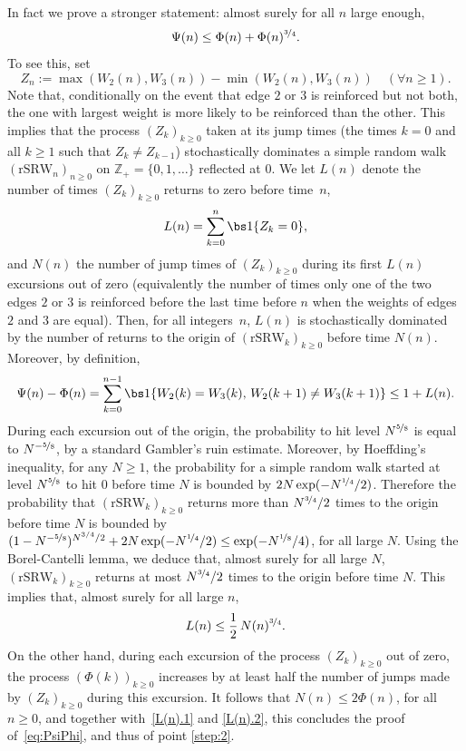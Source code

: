 In fact we prove a stronger statement: almost surely for all $n$ large enough,
\begin{equation}\label{eq:PsiPhi}
\Psi(n) \le \Phi(n) + \Phi(n)^{\nicefrac34}.
\end{equation}
To see this, set
\[
Z_n := \max(W_2(n) , W_3(n)) - \min(W_2(n),W_3(n))\quad (\forall n\geq 1).
\]
Note that, conditionally on the event that edge $2$ or $3$ is reinforced but not both,
the one with largest weight is more likely to be reinforced than the other.
This implies that the process $(Z_k)_{k\ge 0}$ taken at its jump times (\ie the times $k=0$ and all $k\geq 1$ such that $Z_k\neq Z_{k-1}$)
stochastically dominates a simple random walk $(\mathrm{rSRW}_n)_{n\geq 0}$
on $\mathbb Z_+=\{0,1,\dots\}$ reflected at $0$.
We let $L(n)$ denote the number of times $(Z_k)_{k\ge 0}$ returns to zero before time~$n$, \ie
\[
L(n) = \sum_{k=0}^n \bs 1\{Z_k = 0\},
\]
and $N(n)$ the number of jump times of $(Z_k)_{k\ge 0}$ during its first $L(n)$ excursions out of zero
(equivalently the number of times only one of the two edges $2$ or $3$ is reinforced before the last time before $n$ when the weights of edges $2$ and $3$ are equal).
Then, for all integers~$n$, $L(n)$ is stochastically dominated by the number of returns to the origin of $(\mathrm{rSRW}_k)_{k\geq 0}$ before time $N(n)$.
Moreover, by definition,
\begin{equation}\label{L(n).1}
\Psi(n) - \Phi(n) = \sum_{k=0}^{n-1} \bs 1\{W_2(k) = W_3(k), \, W_2(k+1)\neq W_3(k+1)\} \le 1+ L(n).
\end{equation}
During each excursion out of the origin,
the probability to hit level $N^{\nicefrac58}$ is equal to $N^{-\nicefrac58}$, by a standard Gambler's ruin estimate. Moreover, by Hoeffding's inequality, for any $N\ge 1$,
the probability for a simple random walk started at level $N^{\nicefrac58}$ to hit $0$ before time $N$ is bounded by $2N\exp(-N^{\nicefrac14}/2)$.
Therefore the probability that
$(\mathrm{rSRW}_k)_{k\geq 0}$ returns more than $N^{\nicefrac34}/2$ times to the origin before time $N$ is bounded by $(1-N^{-\nicefrac58})^{N^{3/4}/2}+2N\exp(-N^{\nicefrac14}/2) \le \exp(-N^{\nicefrac18}/4)$, for all large $N$.
Using {the} Borel-Cantelli lemma, we deduce that, almost surely for all large $N$, $(\mathrm{rSRW}_k)_{k\geq 0}$ returns at most $N^{\nicefrac34}/2$ times to the origin before time $N$.
This implies that,
almost surely for all large $n$,
\begin{equation}\label{L(n).2}
L(n) \le \frac12\, N(n)^{\nicefrac 34}.
\end{equation}
On the other hand, during each excursion of the process $(Z_k)_{k\ge 0}$ out of zero, the process $(\Phi(k))_{k\ge 0}$ increases by at least half the number of jumps made by $(Z_k)_{k\ge 0}$ during this excursion. It follows that $N(n)\le 2\Phi(n)$, for all $n\ge 0$, and together with~\eqref{L(n).1} and \eqref{L(n).2}, this concludes the proof of~\eqref{eq:PsiPhi}, and thus of point \eqref{step:2}.

